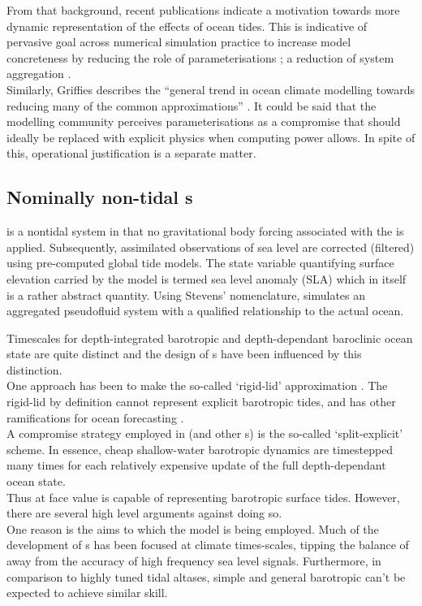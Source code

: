 From that background, recent publications indicate a motivation towards more dynamic representation of the effects of ocean tides.   This is indicative of pervasive goal across numerical simulation practice to increase model concreteness by reducing the role of parameterisations \cite[section 5.3]{Petersen:2012tr}; a reduction of system aggregation \citep{Stevens:2001kb}.\\
Similarly, Griffies describes the ``general trend in ocean climate modelling towards reducing many of the common approximations'' \citep[pp20] {Griffies:2004vs}.
It could be said that the modelling community perceives parameterisations as a compromise that should ideally be replaced with explicit physics when computing power allows.  In spite of this, operational justification is a separate matter.


\subsection{Nominally non-tidal \OGCM{}s}
\label{S:nontidal}

\BL{} is a nontidal system in that no gravitational body forcing associated with the \ATGP{} is applied.   Subsequently, assimilated observations of sea level are corrected (filtered) using pre-computed global tide models.  The state variable quantifying surface elevation carried by the model is termed sea level anomaly (SLA) which in itself is a rather abstract quantity. Using Stevens' nomenclature, \BL{} simulates an aggregated pseudofluid system with a qualified relationship to the actual ocean.


Timescales for depth-integrated barotropic and depth-dependant baroclinic ocean state are quite distinct and the design of \OGCM{}s have been influenced by this distinction. \\
One approach has been to make the so-called `rigid-lid' approximation \cite[pp128]{gill1982atmosphere}. 
The rigid-lid by definition cannot represent explicit barotropic tides, and has other ramifications for ocean forecasting \cite[pp19]{Griffies:2004vs}.\\


A compromise strategy employed in \MOM{} (and other \OGCM{}s) is the so-called `split-explicit' scheme.    
In essence, cheap shallow-water barotropic dynamics are timestepped many times for each relatively expensive update of the full depth-dependant ocean state.  \\
Thus \MOM{} at face value is capable of representing barotropic surface tides.   However, there are several high level arguments against doing so.\\
One reason is the aims to which the model is being employed.  Much of the development of \OGCM{}s has been focused at climate times-scales, tipping the balance of away from the accuracy of high frequency sea level signals.   
Furthermore, in comparison to highly tuned tidal altases, simple and general barotropic can't be expected to achieve similar skill.\\

